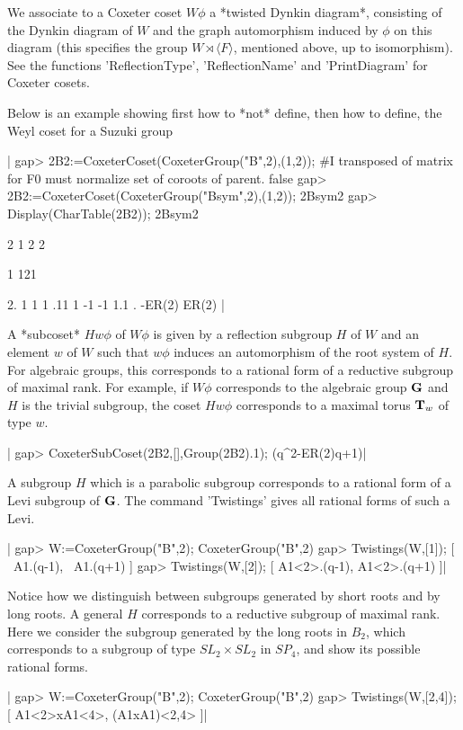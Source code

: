 We  associate  to  a  Coxeter  coset  $W\phi$  a  *twisted Dynkin diagram*,
consisting  of the Dynkin diagram of $W$ and the graph automorphism induced
by  $\phi$  on  this  diagram  (this  specifies  the group $W\rtimes\langle
F\rangle$,   mentioned  above,  up  to   isomorphism).  See  the  functions
'ReflectionType', 'ReflectionName' and 'PrintDiagram' for Coxeter cosets.

Below  is an example showing first how to *not* define, then how to define,
the Weyl coset for a Suzuki group\:

|    gap> 2B2:=CoxeterCoset(CoxeterGroup("B",2),(1,2));
    #I transposed of matrix for F0 must normalize set of coroots of parent.
    false
    gap> 2B2:=CoxeterCoset(CoxeterGroup("Bsym",2),(1,2));
    2Bsym2
    gap> Display(CharTable(2B2));
    2Bsym2

         2 1      2     2

                  1   121

    2.     1      1     1
    .11    1     -1    -1
    1.1    . -ER(2) ER(2)
    |

A  *subcoset* $Hw\phi$ of $W\phi$ is given  by a reflection subgroup $H$ of
$W$  and an element $w$ of $W$ such that $w\phi$ induces an automorphism of
the  root  system  of  $H$.  For  algebraic  groups,  this corresponds to a
rational  form of  a reductive  subgroup of  maximal rank.  For example, if
$W\phi$  corresponds to  the algebraic  group ${\bf G}$  and $H$ is the trivial
subgroup, the coset $Hw\phi$ corresponds to a maximal torus ${\bf T}_w$ of type
$w$.

|    gap> CoxeterSubCoset(2B2,[],Group(2B2).1);
    (q^2-ER(2)q+1)|

A subgroup $H$ which is a parabolic subgroup corresponds to a rational form
of  a Levi  subgroup of  ${\bf G}$. The  command 'Twistings'  gives all rational
forms of such a Levi.

|    gap> W:=CoxeterGroup("B",2);
    CoxeterGroup("B",2)
    gap> Twistings(W,[1]);
    [ ~A1.(q-1), ~A1.(q+1) ]
    gap> Twistings(W,[2]);
    [ A1<2>.(q-1), A1<2>.(q+1) ]|

Notice how we distinguish between subgroups generated by short roots and by
long  roots. A general  $H$ corresponds to  a reductive subgroup of maximal
rank.  Here we consider the subgroup generated  by the long roots in $B_2$,
which  corresponds to a  subgroup of type  $SL_2\times SL_2$ in $SP_4$, and
show its possible rational forms.

|    gap> W:=CoxeterGroup("B",2);
    CoxeterGroup("B",2)
    gap> Twistings(W,[2,4]);
    [ A1<2>xA1<4>, (A1xA1)<2,4> ]|

